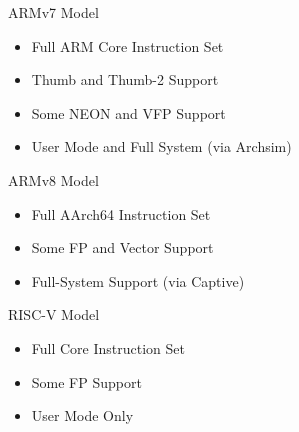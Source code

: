 \begin{frame}{ARMv7 Model}

\begin{itemize}
	\item Full ARM Core Instruction Set
	\item Thumb and Thumb-2 Support
	\item Some NEON and VFP Support
	\item User Mode and Full System (via Archsim)
\end{itemize}

\end{frame}

\begin{frame}{ARMv8 Model}

\begin{itemize}
	\item Full AArch64 Instruction Set
	\item Some FP and Vector Support
	\item Full-System Support (via Captive)
\end{itemize}

\end{frame}

\begin{frame}{RISC-V Model}

\begin{itemize}
	\item Full Core Instruction Set
	\item Some FP Support
	\item User Mode Only
\end{itemize}

\end{frame}
